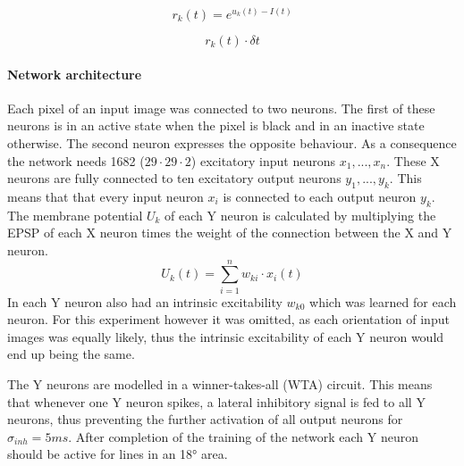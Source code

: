\begin{equation}
\label{eqn:rk}
r_k(t) = e^{u_k(t) - I(t)}
\end{equation}

\begin{equation}
\label{eqn:rkdt}
r_k(t) \cdot \delta t
\end{equation}

\paragraph{Network architecture}
Each pixel of an input image was connected to two neurons. The first of these neurons is in an active state when the pixel is black and in an inactive state otherwise. The second neuron expresses the opposite behaviour. As a consequence the network needs 1682 ($29 \cdot 29 \cdot 2$) excitatory input neurons $x_1,...,x_n$. These X neurons are fully connected to ten excitatory output neurons $y_1,...,y_k$. This means that that every input neuron $x_i$ is connected to each output neuron $y_k$. The membrane potential $U_k$ of each Y neuron is calculated by multiplying the EPSP of each X neuron times the weight of the connection between the X and Y neuron. 
\begin{equation}
\label{eqn:uk}
U_k(t) = \sum_{i=1}^n w_{ki} \cdot x_i(t)
\end{equation}
In \citet{nessler} each Y neuron also had an intrinsic excitability $w_{k0}$ which was learned for each neuron. For this experiment however it was omitted, as each orientation of input images was equally likely, thus the intrinsic excitability of each Y neuron would end up being the same.

The Y neurons are modelled in a winner-takes-all (WTA) circuit. This means that whenever one Y neuron spikes, a lateral inhibitory signal is fed to all Y neurons, thus preventing the further activation of all output neurons for $\sigma_{inh} = 5 ms$. After completion of the training of the network each Y neuron should be active for lines in an 18° area. 


